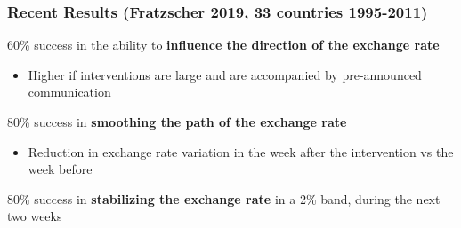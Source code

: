 \documentclass{beamer}
\newenvironment{wideitemize}{\itemize\addtolength{\itemsep}{10pt}}{\enditemize}
\newenvironment{wideenumerate}{\enumerate\addtolength{\itemsep}{10pt}}{\endenumerate}
\begin{document}


\begin{frame}
  \frametitle{Recent Results (Fratzscher 2019, 33 countries 1995-2011)}
  \begin{wideenumerate}
  \item 60\% success in the ability to \textbf{influence the direction of the exchange rate}
    \begin{itemize}
    \item Higher if interventions are large and are accompanied by pre-announced communication
    \end{itemize}
  \item 80\% success in \textbf{smoothing the path of the exchange rate}
    \begin{itemize}
    \item Reduction in exchange rate variation in the week after the intervention vs the week before
    \end{itemize}
  \item 80\% success in \textbf{stabilizing the exchange rate} in a 2\% band, during the next two weeks
  \end{wideenumerate}
\end{frame}
\end{document}
